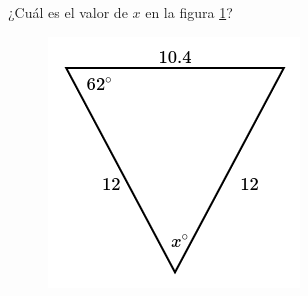 ¿Cuál es el valor de $x$ en la figura \ref{fig:findangle02}?

\begin{minipage}[t][][t]{0.35\textwidth}
    \begin{figure}[H]
        \centering
        \includegraphics[width=0.9\linewidth]{../images/findangle02.png}
        \caption{}
        \label{fig:findangle02}
    \end{figure}
\end{minipage}\hfill
